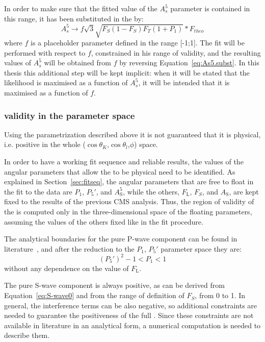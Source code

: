 In order to make sure that the fitted value of the $A_s^5$ parameter is contained in this range, it has been substituted in the \pdf by:
\begin{equation} \label{eq:As5.subst}
  A^5_s\to f\sqrt{3}\sqrt{F_S(1-F_S)F_T(1+P_1)}*F_{theo}
\end{equation}
where $f$ is a placeholder parameter defined in the range [-1;1].
The fit will be performed with respect to $f$, constrained in his range of validity, and the resulting values of $A_s^5$ will be obtained from $f$ by reversing Equation~\ref{eq:As5.subst}.
In this thesis this additional step will be kept implicit: when it will be stated that the likelihood is maximised as a function of $A_s^5$, it will be intended that it is maximised as a function of $f$.

\subsubsection{\pdf validity in the parameter space}
\label{sec:phys.bound}
Using the \pdf parametrization described above it is not guaranteed that it is physical, i.e. positive in the whole ($\cos\theta_K$,$\cos\theta_l$,$\phi$) space.

In order to have a working fit sequence and reliable results, the values of the angular parameters that allow the \pdf to be physical need to be identified.
As explained in Section~\ref{sec:fitseq}, the angular parameters that are free to float in the fit to the data are $P_1$, $P_5'$, and $A^5_\mathrm{S}$, while the others, $F_\mathrm{L}$, $F_S$, and $A_\mathrm{S}$, are kept fixed to the results of the previous CMS analysis.
Thus, the region of validity of the \pdf is computed only in the three-dimensional space of the floating parameters, assuming the values of the others fixed like in the fit procedure.

The analytical boundaries for the pure P-wave component can be found in literature~\cite{Matias:2014jua}, and after the reduction to the $P_1$, $P_5'$ parameter space they are:
\begin{equation} \label{eq:anal.bound}
  (P_5')^2 - 1 < P_1 < 1
\end{equation}
without any dependence on the value of $F_\mathrm{L}$.

The pure S-wave component is always positive, as can be derived from Equation~\ref{eq:S-wave0} and from the range of definition of $F_S$, from 0 to 1.
In general, the interference terms can be also negative, so additional constraints are needed to guarantee the positiveness of the full \pdf.
Since these constraints are not available in literature in an analytical form, a numerical computation is needed to describe them.

